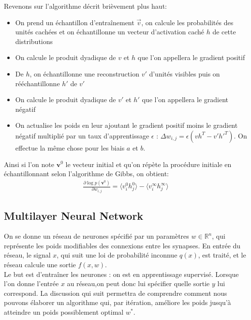 \documentclass{article}
\newcommand{\R}{\mathbb R}
\begin{document}
\noindent Revenons sur l'algorithme décrit brièvement plus haut:
\begin{itemize}
\item On prend un échantillon d'entraînement $\vec{v}$, on calcule les probabilités des unités cachées et on échantillonne un vecteur d'activation caché $h$ de cette distributions
\item On calcule le produit dyadique de $v$ et $h$ que l'on appellera le gradient positif
\item De $h$, on échantillonne une reconstruction $v'$ d'unités visibles puis on rééchantillonne $h'$ de $v'$
\item On calcule le produit dyadique de $v'$ et $h'$ que l'on appellera le gradient négatif
\item On actualise les poids en leur ajoutant le gradient positif moins le gradient négatif multiplié par un taux d'apprentissage $\epsilon$ : $\Delta w_{i,j}=\epsilon (vh^T-v'h'^T)$. On effectue la même chose pour les biais $a$ et $b$.
\end{itemize}

\noindent Ainsi si l'on note $\textbf{v}^0$ le vecteur initial et qu'on répète la procédure initiale en échantillonnant selon l'algorithme de Gibbs, on obtient:
\begin{align*}
\frac{\partial \log p(\textbf{v}^0)}{\partial w_{i,j}}=\langle v_i^0 h_j^0\rangle-\langle v_i^{\infty} h_j^{\infty}\rangle
\end{align*}



\subsection{Multilayer Neural Network}

On se donne un réseau de neurones spécifié par un paramètres $w\in \R^n$, qui représente les poids modifiables des connexions entre les synapses. En entrée du réseau, le signal $x$, qui suit une loi de probabilité inconnue $q(x)$, est traité, et le réseau calcule une sortie $f(x,w)$. \\

Le but est d'entraîner les neurones : on est en apprentissage supervisé. Lorsque l'on donne l'entrée $x$ au réseau,on peut donc lui spécifier quelle sortie $y$ lui correspond. La discussion qui suit permettra de comprendre comment nous pouvons élaborer un algorithme qui, par itération, améliore les poids jusqu'à atteindre un poids possiblement optimal $w^*$.\\
\end{document}

